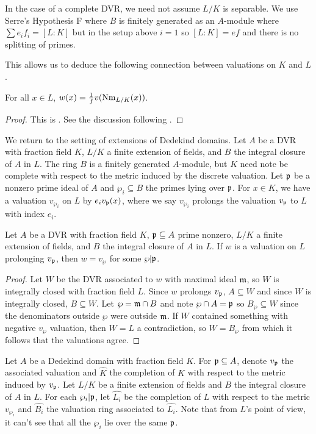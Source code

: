 \begin{remark}
  In the case of a complete DVR, we need not assume $L/K$ is separable. We use Serre's Hypothesis F where $B$ is finitely generated as an $A$-module where $\sum e_{i}f_{i}=[L:K]$ but in the setup above $i=1$ so $[L:K]=ef$ and there is no splitting of primes. 
\end{remark}
This allows us to deduce the following connection between valuations on $K$ and $L$. 
\begin{corollary}
  For all $x\in L$, $w(x)=\frac{1}{f}v(\mathrm{Nm}_{L/K}(x))$. 
\end{corollary}
\begin{proof}
  This is \cite[Ch. 2, \S 2, Corr. 4]{Serre}. See the discussion following \cite[Ch. 2, \S 2, Proposition 3]{Serre}.
\end{proof}
We return to the setting of extensions of Dedekind domains. Let $A$ be a DVR with fraction field $K$, $L/K$ a finite extension of fields, and $B$ the integral closure of $A$ in $L$. The ring $B$ is a finitely generated $A$-module, but $K$ need note be complete with respect to the metric induced by the discrete valuation. Let $\mathfrak{p}$ be a nonzero prime ideal of $A$ and $\wp_{i}\subseteq B$ the primes lying over $\mathfrak{p}$. For $x\in K$, we have a valuation $v_{\wp_{i}}$ on $L$ by $e_{i}v_{\mathfrak{p}}(x)$, where we say $v_{\wp_{i}}$ prolongs the valuation $v_{\mathfrak{p}}$ to $L$ with index $e_{i}$. 
\begin{proposition}
  Let $A$ be a DVR with fraction field $K$, $\mathfrak{p}\subseteq A$ prime nonzero, $L/K$ a finite extension of fields, and $B$ the integral closure of $A$ in $L$. If $w$ is a valuation on $L$ prolonging $v_{\mathfrak{p}}$, then $w=v_{\wp}$ for some $\wp|\mathfrak{p}$. 
\end{proposition}
\begin{proof}
  Let $W$ be the DVR associated to $w$ with maximal ideal $\mathfrak{m}$, so $W$ is integrally closed with fraction field $L$. Since $w$ prolongs $v_{\mathfrak{p}}$, $A\subseteq W$ and since $W$ is integrally closed, $B\subseteq W$. Let $\wp=\mathfrak{m}\cap B$ and note $\wp\cap A=\mathfrak{p}$ so $B_{\wp}\subseteq W$ since the denominators outside $\wp$ were outside $\mathfrak{m}$. If $W$ contained something with negative $v_{\wp}$ valuation, then $W=L$ a contradiction, so $W=B_{\wp}$ from which it follows that the valuations agree. 
\end{proof}
Let $A$ be a Dedekind domain with fraction field $K$. For $\mathfrak{p}\subseteq A$, denote $v_{\mathfrak{p}}$ the associated valuation and $\widehat{K}$ the completion of $K$ with respect to the metric induced by $v_{\mathfrak{p}}$. Let $L/K$ be a finite extension of fields and $B$ the integral closure of $A$ in $L$. For each $\wp_{i}|\mathfrak{p}$, let $\widehat{L_{i}}$ be the completion of $L$ with respect to the metric $v_{\wp_{i}}$ and $\widehat{B_{i}}$ the valuation ring associated to $\widehat{L_{i}}$. Note that from $L$'s point of view, it can't see that all the $\wp_{i}$ lie over the same $\mathfrak{p}$. 
